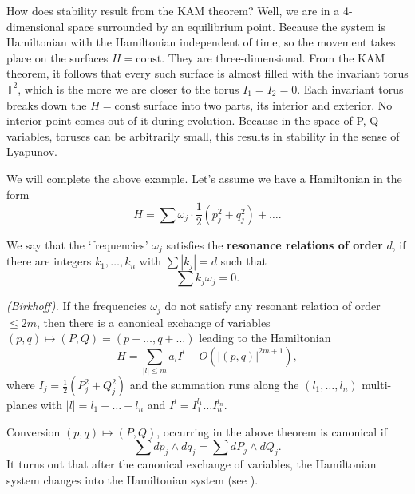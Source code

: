 \begin{example}
	How does stability result from the KAM theorem? Well, we are in a 4-dimensional space surrounded by an equilibrium point. Because the system is Hamiltonian with the Hamiltonian independent of time, so the movement takes place on the surfaces $H=\textrm{const}$. They are three-dimensional. From the KAM theorem, it follows that every such surface is almost filled with the invariant torus $\mathbb{T}^{2}$, which is the more we are closer to the torus $I_{1}=I_{2}=0$. Each invariant torus breaks down the $H=\textrm{const}$ surface into two parts, its interior and exterior. No interior point comes out of it during evolution. Because in the space of P, Q variables, toruses can be arbitrarily small, this results in stability in the sense of Lyapunov.
\end{example}

We will complete the above example. Let's assume we have a Hamiltonian in the form
$$
H=\sum \omega _{j}\cdot \frac{1}{2}(p_{j}^{2}+q_{j}^{2}) + \ldots .
$$

\begin{definition}
	We say that the `frequencies' $\omega _{j}$ satisfies the \textbf{resonance relations of order} $d$, if there are integers $k_{1},\ldots ,k_{n}$ with $\sum \left\vert
	k_{j}\right\vert =d$ such that
	$$
	\sum k_{j}\omega _{j}=0.
	$$
\end{definition}

\begin{theorem}\label{theo:4.9}\emph{(Birkhoff).}
	If the frequencies $\omega _{j}$ do not satisfy any resonant relation of order $\leq 2m$, then there is a canonical exchange of variables $\left( p,q\right) \longmapsto \left( P,Q\right) =\left( p+\ldots ,q+\ldots
	\right) $ leading to the Hamiltonian
	$$
	H=\sum_{\left\vert l\right\vert \leq m}a_{l}I^{l}+O\left( \left\vert \left(
	p,q\right) \right\vert ^{2m+1}\right) ,
	$$
	where $I_{j}=\frac{1}{2}(P_{j}^{2}+Q_{j}^{2})$ and the summation runs along the $\left( l_{1},\ldots
	,l_{n}\right) $ multi-planes with $\left\vert l\right\vert =l_{1}+\ldots +l_{n}$ and $I^{l}=I_{1}^{l_{1}}\ldots I_{n}^{l_{n}}$.
\end{theorem}

\begin{remark}
	Conversion $\left( p,q\right) \longmapsto \left(P,Q\right) $, occurring in the above theorem is canonical if
	$$
	\sum dp_{j}\wedge dq_{j}=\sum dP_{j}\wedge dQ_{j}.
	$$
	It turns out that after the canonical exchange of variables, the Hamiltonian system changes into the Hamiltonian system (see \cite{Ar3}).
\end{remark}

